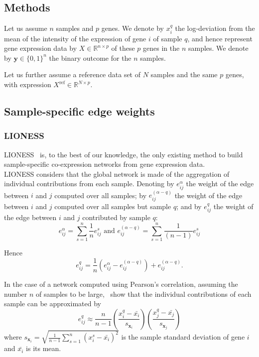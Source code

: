 \documentclass{bioinfo}
\newcommand{\xmat}{X}
\newcommand{\xx}{\bm{x}}
\newcommand{\yy}{\bm{y}}
\newcommand{\xxref}{X^{\mbox{ref}}}
\begin{document}
\begin{methods}
\section{Methods}
Let us assume $n$ samples and $p$ genes. We denote by $x_{i}^q$ the log-deviation from the mean of the intensity of the expression of gene $i$ of sample $q$, and hence represent gene expression data by  $\xmat \in \mathbb{R}^{n \times p}$ of these $p$ genes in the $n$ samples. We denote by $\yy \in \{0, 1\}^n$ the binary outcome for the $n$ samples.

Let us further assume a reference data set of $N$ samples and the same $p$ genes, with expression $\xxref \in \mathbb{R}^{N \times p}$.






\subsection{Sample-specific edge weights}

\subsubsection{LIONESS}
LIONESS~\citep{kuijjer2015} is, to the best of our knowledge, the only existing method to build sample-specific co-expression networks from gene expression data.\\

LIONESS considers that the global network is made of the aggregation of individual contributions from each sample. 
Denoting by $e_{ij}^\alpha$ the weight of the edge between $i$ and $j$ computed over all samples;
by $e_{ij}^{(\alpha - q)}$ the weight of the edge between $i$ and $j$ computed over all samples but sample $q$;
and by $e_{ij}^q$ the weight of the edge between $i$ and $j$ contributed by sample $q$:
    \[
    e_{ij}^\alpha = \sum_{s=1}^n \frac{1}{n} e_{ij}^s 
    \mbox{ and }
    e_{ij}^{(\alpha - q)} = \sum_{s=1}^n \frac{1}{(n-1)} e_{ij}^s
    \]

Hence
    \[
    e_{ij}^q = \frac{1}{n} \left(  e_{ij}^{\alpha} - e_{ij}^{(\alpha - q)} \right) + e_{ij}^{(\alpha - q)}.
    \]

In the case of a network computed using Pearson's correlation, assuming the number $n$ of samples to be large,~\cite{kuijjer2015} show that the individual contributions of each sample can be approximated by
    \[
    e_{ij}^q \approx \frac{n}{n-1} \left( \frac{x_i^q - \bar {x_i}}{s_{\xx_i}} \right) 
    \left( \frac{x_j^q - \bar {x_j}}{s_{\xx_j}} \right)
    \]
    where $s_{\xx_i} = \sqrt{\frac{1}{n-1} \sum_{s=1}^n \left( x_i^s - \bar{x_i} \right)^2}$ is the sample standard deviation of gene $i$ and $\bar{x_i}$ is its mean.


\end{methods}
\end{document}
